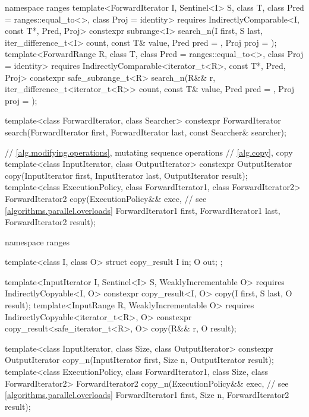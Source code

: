 \begin{codeblock}
{  namespace ranges {
    template<ForwardIterator I, Sentinel<I> S, class T,
        class Pred = ranges::equal_to<>, class Proj = identity>
      requires IndirectlyComparable<I, const T*, Pred, Proj>
      constexpr subrange<I>
        search_n(I first, S last, iter_difference_t<I> count,
                 const T& value, Pred pred = {}, Proj proj = {});
    template<ForwardRange R, class T, class Pred = ranges::equal_to<>,
        class Proj = identity>
      requires IndirectlyComparable<iterator_t<R>, const T*, Pred, Proj>
      constexpr safe_subrange_t<R>
        search_n(R&& r, iter_difference_t<iterator_t<R>> count,
                 const T& value, Pred pred = {}, Proj proj = {});
  }

  template<class ForwardIterator, class Searcher>
    constexpr ForwardIterator
      search(ForwardIterator first, ForwardIterator last, const Searcher& searcher);

  // \ref{alg.modifying.operations}, mutating sequence operations
  // \ref{alg.copy}, copy
  template<class InputIterator, class OutputIterator>
    constexpr OutputIterator copy(InputIterator first, InputIterator last,
                                  OutputIterator result);
  template<class ExecutionPolicy, class ForwardIterator1, class ForwardIterator2>
    ForwardIterator2 copy(ExecutionPolicy&& exec, // see \ref{algorithms.parallel.overloads}
                          ForwardIterator1 first, ForwardIterator1 last,
                          ForwardIterator2 result);

  namespace ranges {
    template<class I, class O>
    struct copy_result {
      I in;
      O out;
    };

    template<InputIterator I, Sentinel<I> S, WeaklyIncrementable O>
      requires IndirectlyCopyable<I, O>
      constexpr copy_result<I, O>
        copy(I first, S last, O result);
    template<InputRange R, WeaklyIncrementable O>
      requires IndirectlyCopyable<iterator_t<R>, O>
      constexpr copy_result<safe_iterator_t<R>, O>
        copy(R&& r, O result);
  }

  template<class InputIterator, class Size, class OutputIterator>
    constexpr OutputIterator copy_n(InputIterator first, Size n,
                                    OutputIterator result);
  template<class ExecutionPolicy, class ForwardIterator1, class Size,
           class ForwardIterator2>
    ForwardIterator2 copy_n(ExecutionPolicy&& exec, // see \ref{algorithms.parallel.overloads}
                            ForwardIterator1 first, Size n,
                            ForwardIterator2 result);

}
\end{codeblock}
